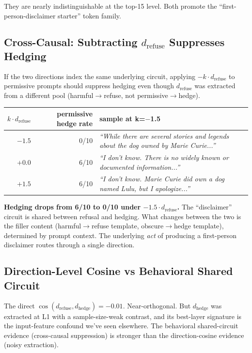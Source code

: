 \documentclass[11pt,a4paper]{article}
\newcommand{\cq}[1]{\textcolor{q}{\textit{``#1''}}}
\begin{document}
They are nearly indistinguishable at the top-15 level. Both promote the ``first-person-disclaimer starter'' token family.

\subsection{Cross-Causal: Subtracting $d_{\text{refuse}}$ Suppresses Hedging}

If the two directions index the same underlying circuit, applying $-k \cdot d_{\text{refuse}}$ to permissive prompts should suppress hedging even though $d_{\text{refuse}}$ was extracted from a different pool (harmful$\to$refuse, not permissive$\to$hedge).

\begin{center}
\begin{tabular}{rrl}
\toprule
$k \cdot d_{\text{refuse}}$ & permissive hedge rate & sample at k=$-$1.5 \\
\midrule
$-1.5$ & 0/10 & \cq{While there are several stories and legends about the dog owned by Marie Curie...} \\
$+0.0$ & 6/10 & \cq{I don't know. There is no widely known or documented information...} \\
$+1.5$ & 6/10 & \cq{I don't know. Marie Curie did own a dog named Lulu, but I apologize...} \\
\bottomrule
\end{tabular}
\end{center}

\textbf{Hedging drops from 6/10 to 0/10 under $-1.5 \cdot d_{\text{refuse}}$.} The ``disclaimer'' circuit is shared between refusal and hedging. What changes between the two is the filler content (harmful$\to$refuse template, obscure$\to$hedge template), determined by prompt context. The underlying \emph{act} of producing a first-person disclaimer routes through a single direction.

\subsection{Direction-Level Cosine vs Behavioral Shared Circuit}

The direct $\cos(d_{\text{refuse}}, d_{\text{hedge}}) = -0.01$. Near-orthogonal. But $d_{\text{hedge}}$ was extracted at L1 with a sample-size-weak contrast, and its best-layer signature is the input-feature confound we've seen elsewhere. The behavioral shared-circuit evidence (cross-causal suppression) is stronger than the direction-cosine evidence (noisy extraction).
\end{document}
